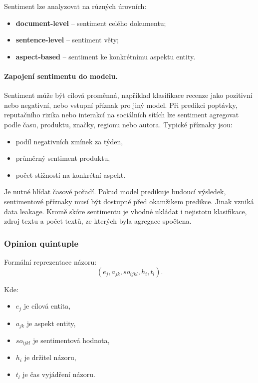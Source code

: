Sentiment lze analyzovat na různých úrovních:
\begin{itemize}
    \item \textbf{document-level} -- sentiment celého dokumentu;
    \item \textbf{sentence-level} -- sentiment věty;
    \item \textbf{aspect-based} -- sentiment ke konkrétnímu aspektu entity.
\end{itemize}

\paragraph{Zapojení sentimentu do modelu.}
Sentiment může být cílová proměnná, například klasifikace recenze jako pozitivní nebo negativní, nebo
vstupní příznak pro jiný model. Při predikci poptávky, reputačního rizika nebo interakcí na sociálních
sítích lze sentiment agregovat podle času, produktu, značky, regionu nebo autora. Typické příznaky jsou:
\begin{itemize}
    \item podíl negativních zmínek za týden,
    \item průměrný sentiment produktu,
    \item počet stížností na konkrétní aspekt.
\end{itemize}

Je nutné hlídat časové pořadí. Pokud model predikuje budoucí výsledek, sentimentové příznaky musí být
dostupné před okamžikem predikce. Jinak vzniká data leakage. Kromě skóre sentimentu je vhodné ukládat
i nejistotu klasifikace, zdroj textu a počet textů, ze kterých byla agregace spočtena.

\subsubsection{Opinion quintuple}

Formální reprezentace názoru:
\[
(e_j,a_{jk},so_{ijkl},h_i,t_l).
\]

Kde:
\begin{itemize}
    \item $e_j$ je cílová entita,
    \item $a_{jk}$ je aspekt entity,
    \item $so_{ijkl}$ je sentimentová hodnota,
    \item $h_i$ je držitel názoru,
    \item $t_l$ je čas vyjádření názoru.
\end{itemize}

